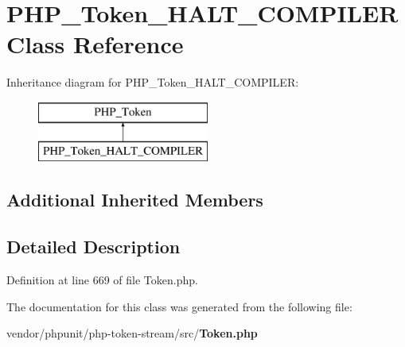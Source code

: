 \section{P\+H\+P\+\_\+\+Token\+\_\+\+H\+A\+L\+T\+\_\+\+C\+O\+M\+P\+I\+L\+E\+R Class Reference}
\label{class_p_h_p___token___h_a_l_t___c_o_m_p_i_l_e_r}
Inheritance diagram for P\+H\+P\+\_\+\+Token\+\_\+\+H\+A\+L\+T\+\_\+\+C\+O\+M\+P\+I\+L\+E\+R\+:\begin{figure}[H]
\begin{center}
\leavevmode
\includegraphics[height=2.000000cm]{class_p_h_p___token___h_a_l_t___c_o_m_p_i_l_e_r}
\end{center}
\end{figure}
\subsection*{Additional Inherited Members}


\subsection{Detailed Description}


Definition at line 669 of file Token.\+php.



The documentation for this class was generated from the following file\+:\begin{DoxyCompactItemize}
\item 
vendor/phpunit/php-\/token-\/stream/src/{\bf Token.\+php}\end{DoxyCompactItemize}
